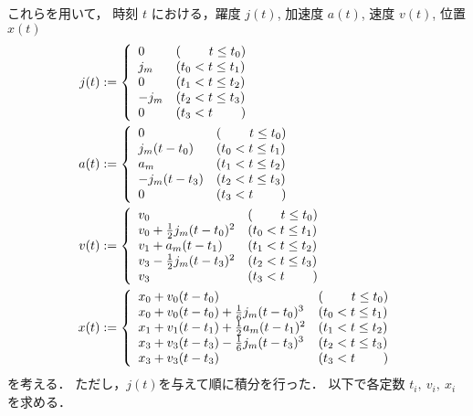 \documentclass[a5paper]{ltjsarticle}
\begin{document}
これらを用いて，
時刻 $t$ における，躍度 $j(t)$, 加速度 $a(t)$, 速度 $v(t)$, 位置 $x(t)$
\begin{align}
    j(t)
     & :=
    \left\{ \begin{array}{ll}
        0    & (\hspace{2.2em}t \le t_0) \\
        j_m  & (t_0 < t \le t_1)         \\
        0    & (t_1 < t \le t_2)         \\
        -j_m & (t_2 < t \le t_3)         \\
        0    & (t_3 < t \hspace{2.2em})
    \end{array} \right.
    \\
    a(t)
     & :=
    \left\{ \begin{array}{ll}
        0           & (\hspace{2.2em}t \le t_0) \\
        j_m(t-t_0)  & (t_0 < t \le t_1)         \\
        a_m         & (t_1 < t \le t_2)         \\
        -j_m(t-t_3) & (t_2 < t \le t_3)         \\
        0           & (t_3 < t \hspace{2.2em})
    \end{array} \right.
    \\
    v(t)
     & :=
    \left\{ \begin{array}{ll}
        v_0                           & (\hspace{2.2em} t \le t_0) \\
        v_0 + \frac{1}{2}j_m(t-t_0)^2 & (t_0 < t \le t_1)          \\
        v_1 + a_m(t-t_1)              & (t_1 < t \le t_2)          \\
        v_3 - \frac{1}{2}j_m(t-t_3)^2 & (t_2 < t \le t_3)          \\
        v_3                           & (t_3 < t \hspace{2.2em})
    \end{array} \right.
    \\
    x(t)
     & :=
    \left\{ \begin{array}{ll}
        x_0 + v_0(t-t_0)                           & (\hspace{2.2em} t \le t_0) \\
        x_0 + v_0(t-t_0) + \frac{1}{6}j_m(t-t_0)^3 & (t_0 < t \le t_1)          \\
        x_1 + v_1(t-t_1) + \frac{1}{2}a_m(t-t_1)^2 & (t_1 < t \le t_2)          \\
        x_3 + v_3(t-t_3) - \frac{1}{6}j_m(t-t_3)^3 & (t_2 < t \le t_3)          \\
        x_3 + v_3(t-t_3)                           & (t_3 < t \hspace{2.2em})
    \end{array} \right.
\end{align}
を考える．
ただし，$j(t)$を与えて順に積分を行った．
以下で各定数 $t_i,~ v_i,~ x_i$ を求める．
\end{document}
